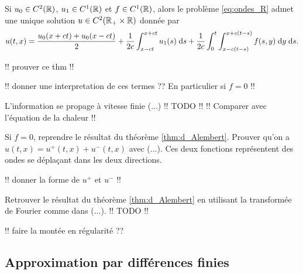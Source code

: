 \documentclass[12pt,a4paper,twoside]{article}
\begin{document}
\begin{theorem}
  \label{thm:d_Alembert}
  Si $u_0 \in C^2(\mathbb{R})$, $u_1 \in C^1(\mathbb{R})$ et $f \in C^1(\mathbb{R})$,
  alors le probl\`eme \eqref{eq:ondes_R} admet une unique solution 
  $u \in C^2(\mathbb{R}_+ \times \mathbb{R})$ donn\'ee par 
  \begin{align*}
    u(t,x) = \dfrac{u_0(x+ct) + u_0(x-ct)}{2} 
    + \dfrac{1}{2c} \int_{x-ct}^{x+ct} u_1(s) \;\mathrm{d} s
    + \dfrac{1}{2c} \int_0^t \int_{x - c(t-s)}^{x+c(t-s)} f(s,y) \;\mathrm{d} y \;\mathrm{d} s .
  \end{align*}
\end{theorem}

!! prouver ce thm !!

!! donner une interpretation de ces termes ??
En particulier si $f=0$ !!

\begin{remark}
  L'information se propage \`a vitesse finie (...)
  !! TODO !! !! Comparer avec l'\'equation de la chaleur !!
\end{remark}

\begin{exercise}
  Si $f=0$, reprendre le r\'esultat du th\'eor\`eme \ref{thm:d_Alembert}.
  Prouver qu'on a $u(t,x) = u^+(t,x) + u^-(t,x)$
  avec (...).
  Ces deux fonctions repr\'esentent des ondes se d\'epla\c{c}ant
  dans les deux directions.

  !! donner la forme de $u^+$ et $u^-$ !!
\end{exercise}

\begin{exercise}
  Retrouver le r\'esultat du th\'eor\`eme \ref{thm:d_Alembert}
  en utilisant la transform\'ee de Fourier comme dans (...).
  !! TODO !!
\end{exercise}


!! faire la mont\'ee en r\'egularit\'e ??

\subsection{Approximation par diff\'erences finies}
\end{document}
